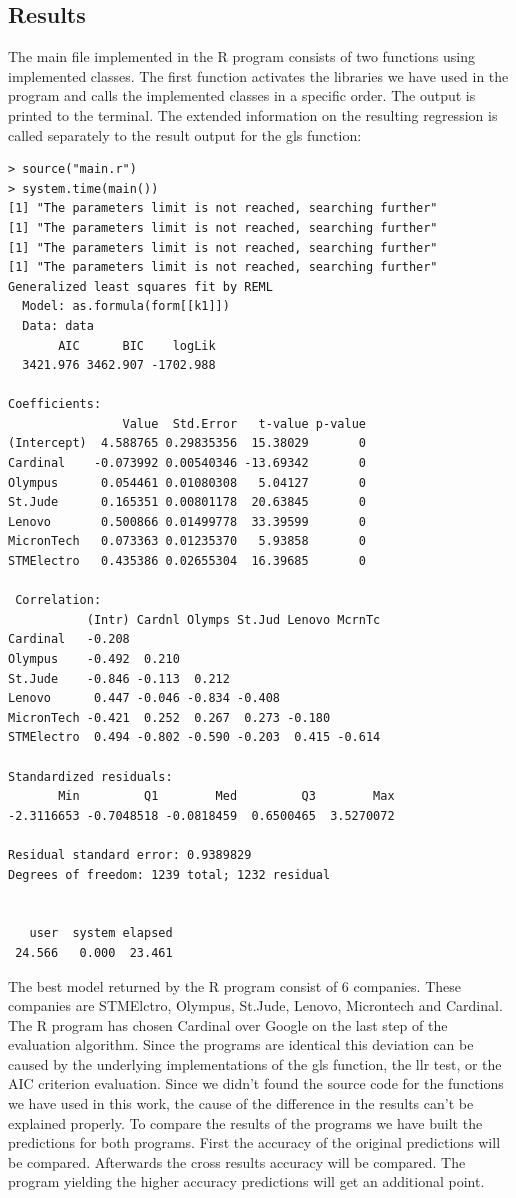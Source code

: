 \documentclass[
  twoside,
  12pt, a4paper,
  footinclude=true,
  headinclude=true,
  cleardoublepage=empty
]{article}
\begin{document}
\subsection{Results}
The main file implemented in the R program consists of two functions using implemented classes. The first function activates the libraries we have used in the program and calls the implemented classes in a specific order. The output is printed to the terminal. The extended information on the resulting regression is called separately to the result output for the gls function:
\begin{verbatim}
> source("main.r")
> system.time(main())
[1] "The parameters limit is not reached, searching further"
[1] "The parameters limit is not reached, searching further"
[1] "The parameters limit is not reached, searching further"
[1] "The parameters limit is not reached, searching further"
Generalized least squares fit by REML
  Model: as.formula(form[[k1]]) 
  Data: data 
       AIC      BIC    logLik
  3421.976 3462.907 -1702.988

Coefficients:
                Value  Std.Error   t-value p-value
(Intercept)  4.588765 0.29835356  15.38029       0
Cardinal    -0.073992 0.00540346 -13.69342       0
Olympus      0.054461 0.01080308   5.04127       0
St.Jude      0.165351 0.00801178  20.63845       0
Lenovo       0.500866 0.01499778  33.39599       0
MicronTech   0.073363 0.01235370   5.93858       0
STMElectro   0.435386 0.02655304  16.39685       0

 Correlation: 
           (Intr) Cardnl Olymps St.Jud Lenovo McrnTc
Cardinal   -0.208                                   
Olympus    -0.492  0.210                            
St.Jude    -0.846 -0.113  0.212                     
Lenovo      0.447 -0.046 -0.834 -0.408              
MicronTech -0.421  0.252  0.267  0.273 -0.180       
STMElectro  0.494 -0.802 -0.590 -0.203  0.415 -0.614

Standardized residuals:
       Min         Q1        Med         Q3        Max 
-2.3116653 -0.7048518 -0.0818459  0.6500465  3.5270072 

Residual standard error: 0.9389829 
Degrees of freedom: 1239 total; 1232 residual


   user  system elapsed 
 24.566   0.000  23.461 

\end{verbatim}    
The best model returned by the R program consist of 6 companies. These companies are STMElctro, Olympus, St.Jude, Lenovo, Microntech and Cardinal. The R program has chosen Cardinal over Google on the last step of the evaluation algorithm. Since the programs are identical this deviation can be caused by the underlying implementations of the gls function, the llr test, or the AIC criterion evaluation. Since we didn't found the source code for the functions we have used in this work, the cause of the difference in the results can't be explained properly. To compare the results of the programs we have built the predictions for both programs. First the accuracy of the original predictions will be compared. Afterwards the cross results accuracy will be compared. The program yielding the higher accuracy predictions will get an additional point.\\
\end{document}
